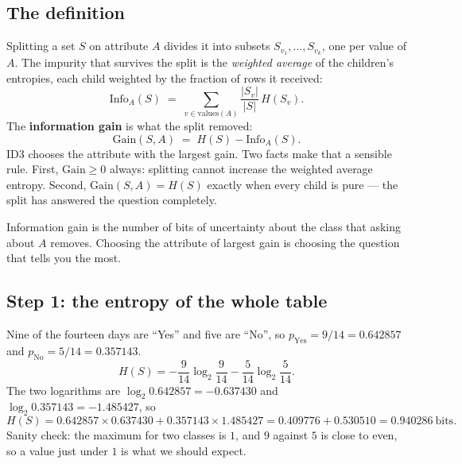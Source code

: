 \documentclass[11pt]{article}
\begin{document}
\subsection{The definition}

Splitting a set $S$ on attribute $A$ divides it into subsets
$S_{v_1}, \dots, S_{v_k}$, one per value of $A$. The impurity that survives
the split is the \emph{weighted average} of the children's entropies, each
child weighted by the fraction of rows it received:
\begin{equation}
  \label{eq:infoA}
  \mathrm{Info}_A(S) \;=\; \sum_{v \in \mathrm{values}(A)}
    \frac{|S_v|}{|S|} \, H(S_v) .
\end{equation}
The \textbf{information gain} is what the split removed:
\begin{equation}
  \label{eq:gain}
  \mathrm{Gain}(S, A) \;=\; H(S) - \mathrm{Info}_A(S) .
\end{equation}
ID3 chooses the attribute with the largest gain. Two facts make that a
sensible rule. First, $\mathrm{Gain} \ge 0$ always: splitting cannot increase
the weighted average entropy. Second, $\mathrm{Gain}(S,A) = H(S)$ exactly when
every child is pure --- the split has answered the question completely.

\begin{keyidea}
Information gain is the number of bits of uncertainty about the class that
asking about $A$ removes. Choosing the attribute of largest gain is choosing
the question that tells you the most.
\end{keyidea}

\subsection{Step 1: the entropy of the whole table}

\begin{worked}
Nine of the fourteen days are ``Yes'' and five are ``No'', so
$p_{\text{Yes}} = 9/14 = 0.642857$ and $p_{\text{No}} = 5/14 = 0.357143$.
\[
  H(S) = -\frac{9}{14}\log_2\frac{9}{14} - \frac{5}{14}\log_2\frac{5}{14} .
\]
The two logarithms are $\log_2 0.642857 = -0.637430$ and
$\log_2 0.357143 = -1.485427$, so
\[
  H(S) = 0.642857 \times 0.637430 + 0.357143 \times 1.485427
       = 0.409776 + 0.530510 = \mathbf{0.940286}\ \text{bits}.
\]
Sanity check: the maximum for two classes is $1$, and $9$ against $5$ is
close to even, so a value just under $1$ is what we should expect.
\end{worked}
\end{document}

